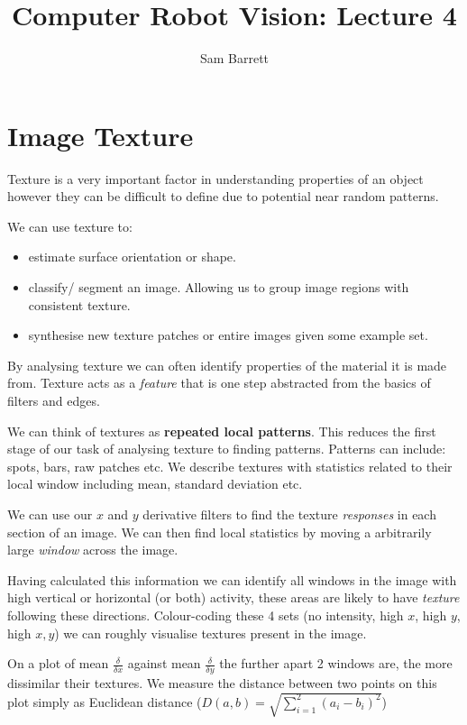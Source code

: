\documentclass{article}
\title{Computer\/ Robot Vision: Lecture 4}
\author{Sam Barrett}
\begin{document}
\maketitle

\section{Image Texture}
\label{sec:texture}

Texture is a very important factor in understanding properties of an object however they can be difficult to define due to potential near random patterns.

We can use texture to:

\begin{itemize}
  \item estimate surface orientation or shape.
  \item classify/ segment an image. Allowing us to group image regions with consistent texture.
        \item synthesise new texture patches or entire images given some example set.
\end{itemize}

By analysing texture we can often identify properties of the material it is made from. Texture acts as a \textit{feature} that is one step abstracted from the basics of filters and edges.

We can think of textures as \textbf{repeated local patterns}. This reduces the first stage of our task of analysing texture to finding patterns. Patterns can include: spots, bars, raw patches etc. We describe textures with statistics related to their local window including mean, standard deviation etc.

We can use our $x$ and $y$ derivative filters to find the texture \textit{responses} in each section of an image. We can then find local statistics by moving a arbitrarily large \textit{window} across the image.

Having calculated this information we can identify all windows in the image with high vertical or horizontal (or both) activity, these areas are likely to have \textit{texture} following these directions. Colour-coding these 4 sets (no intensity, high $x$, high $y$, high $x,y$) we can roughly visualise textures present in the image.

On a plot of mean $\frac{\delta}{\delta x}$ against mean $\frac{\delta}{\delta y}$ the further apart 2 windows are, the more dissimilar their textures. We measure the distance between two points on this plot simply as Euclidean distance ($D(a,b) = \sqrt{\sum_{i=1}^2 (a_{i} - b_{i})^{2}}$)
\end{document}
